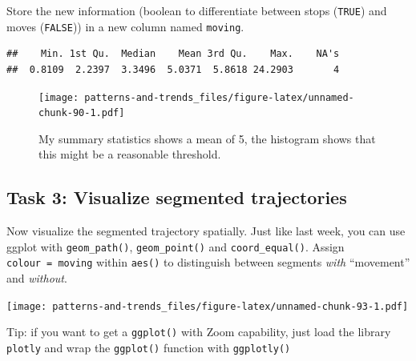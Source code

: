 \documentclass[]{book}
\begin{document}
Store the new information (boolean to differentiate between stops (\texttt{TRUE}) and moves (\texttt{FALSE})) in a new column named \texttt{moving}.

\begin{verbatim}
##    Min. 1st Qu.  Median    Mean 3rd Qu.    Max.    NA's 
##  0.8109  2.2397  3.3496  5.0371  5.8618 24.2903       4
\end{verbatim}

\begin{figure}
\centering
\texttt{[image: patterns-and-trends\_files/figure-latex/unnamed-chunk-90-1.pdf]}
\caption{\label{fig:unnamed-chunk-90}My summary statistics shows a mean of 5, the histogram shows that this might be a reasonable threshold.}
\end{figure}

\hypertarget{task-3-visualize-segmented-trajectories}{%
\subsection{Task 3: Visualize segmented trajectories}\label{task-3-visualize-segmented-trajectories}}

Now visualize the segmented trajectory spatially. Just like last week, you can use ggplot with \texttt{geom\_path()}, \texttt{geom\_point()} and \texttt{coord\_equal()}. Assign \texttt{colour\ =\ moving} within \texttt{aes()} to distinguish between segments \emph{with} ``movement'' and \emph{without}.

\texttt{[image: patterns-and-trends\_files/figure-latex/unnamed-chunk-93-1.pdf]}

Tip: if you want to get a \texttt{ggplot()} with Zoom capability, just load the library \texttt{plotly} and wrap the \texttt{ggplot()} function with \texttt{ggplotly()}
\end{document}
